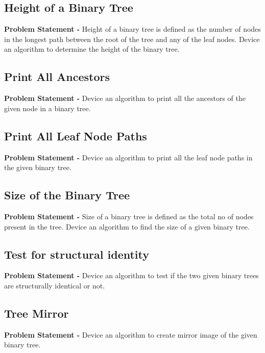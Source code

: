 \documentclass[12pt,a4paper,draft]{article}
\begin{document}
\subsection{Height of a Binary Tree}
\textbf{Problem Statement -} Height of a binary tree is defined as the number of nodes in the longest path between the root of the tree and any of the leaf nodes. Device an algorithm to determine the height of the binary tree.
\subsection{Print All Ancestors}
\textbf{Problem Statement -} Device an algorithm to print all the ancestors of the given node in a binary tree.
\subsection{Print All Leaf Node Paths}
\textbf{Problem Statement -} Device an algorithm to print all the leaf node paths in the given binary tree.
\subsection{Size of the Binary Tree}
\textbf{Problem Statement -} Size of a binary tree is defined as the total no of nodes present in the tree. Device an algorithm to find the size of a given binary tree.
\subsection{Test for structural identity}
\textbf{Problem Statement -} Device an algorithm to test if the two given binary trees are structurally identical or not.
\subsection{Tree Mirror}
\textbf{Problem Statement -} Device an algorithm to create mirror image of the given binary tree.
\end{document}
